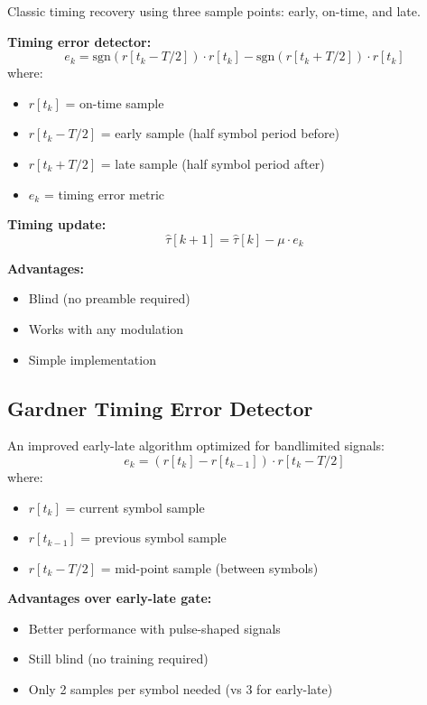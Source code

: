 Classic timing recovery using three sample points: early, on-time, and late.

\textbf{Timing error detector:}
\begin{equation}
e_k = \text{sgn}(r[t_k - T/2]) \cdot r[t_k] - \text{sgn}(r[t_k + T/2]) \cdot r[t_k]
\end{equation}
where:
\begin{itemize}
\item $r[t_k]$ = on-time sample
\item $r[t_k - T/2]$ = early sample (half symbol period before)
\item $r[t_k + T/2]$ = late sample (half symbol period after)
\item $e_k$ = timing error metric
\end{itemize}

\textbf{Timing update:}
\begin{equation}
\hat{\tau}[k+1] = \hat{\tau}[k] - \mu \cdot e_k
\end{equation}

\textbf{Advantages:}
\begin{itemize}
\item[\checkmark] Blind (no preamble required)
\item[\checkmark] Works with any modulation
\item[\checkmark] Simple implementation
\end{itemize}

\subsection{Gardner Timing Error Detector}

An improved early-late algorithm optimized for bandlimited signals:
\begin{equation}
e_k = (r[t_k] - r[t_{k-1}]) \cdot r[t_k - T/2]
\end{equation}
where:
\begin{itemize}
\item $r[t_k]$ = current symbol sample
\item $r[t_{k-1}]$ = previous symbol sample
\item $r[t_k - T/2]$ = mid-point sample (between symbols)
\end{itemize}

\textbf{Advantages over early-late gate:}
\begin{itemize}
\item[\checkmark] Better performance with pulse-shaped signals
\item[\checkmark] Still blind (no training required)
\item[\checkmark] Only 2 samples per symbol needed (vs 3 for early-late)
\end{itemize}

